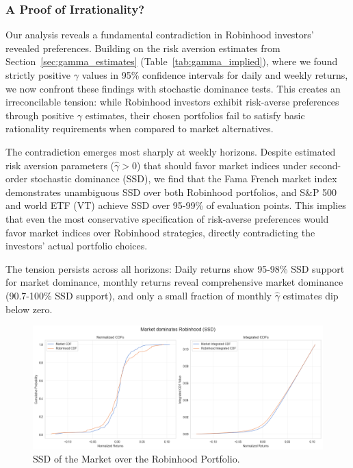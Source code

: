\subsubsection{A Proof of Irrationality?}
Our analysis reveals a fundamental contradiction in Robinhood investors' revealed preferences. 
Building on the risk aversion estimates from Section~\ref{sec:gamma_estimates} (Table~\ref{tab:gamma_implied}), where we found strictly positive $\gamma$ values in 95\% confidence intervals for daily and weekly returns, we now confront these findings with stochastic dominance tests. 
This creates an irreconcilable tension: while Robinhood investors exhibit risk-averse preferences through positive $\gamma$ estimates, their chosen portfolios fail to satisfy basic rationality requirements when compared to market alternatives.

The contradiction emerges most sharply at weekly horizons. 
Despite estimated risk aversion parameters ($\hat{\gamma} > 0$) that should favor market indices under second-order stochastic dominance (SSD), we find that the Fama French market index demonstrates unambiguous SSD over both Robinhood portfolios, 
and S\&P 500 and world ETF (VT) achieve SSD over 95-99\% of evaluation points.
This implies that even the most conservative specification of risk-averse preferences would favor market indices over Robinhood strategies, directly contradicting the investors' actual portfolio choices.

The tension persists across all horizons: Daily returns show 95-98\% SSD support for market dominance, monthly returns reveal comprehensive market dominance (90.7-100\% SSD support), and only a small fraction of monthly $\hat{\gamma}$ estimates dip below zero.

\begin{figure}[H]
    \centering
    \includegraphics[width=0.8\linewidth]{../images/risk/ssd_number_5d_mkt.png}
    \caption{SSD of the Market over the Robinhood Portfolio.}
\label{fig:fsd_fedyk_mine}
\end{figure}    

